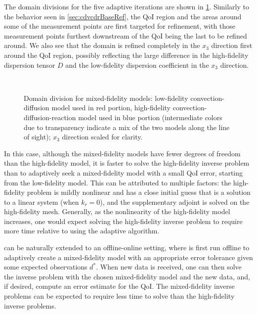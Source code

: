 The domain divisions for the five adaptive iterations are shown in \cref{fig:divvy3D_diffmesh}. Similarly to the behavior seen in \cref{sec:cdvcdrBaseRef}, the QoI region and the areas around some of the measurement points are first targeted for refinement, with those measurement points furthest downstream of the QoI being the last to be refined around. We also see that the domain is refined completely in the $x_3$ direction first around the QoI region, possibly reflecting the large difference in the high-fidelity dispersion tensor $D$ and the low-fidelity dispersion coefficient in the $x_3$ direction.
%
\begin{figure}[htbp]
\centering
{}
 \\
\caption{Domain division for mixed-fidelity models: low-fidelity convection-diffusion model used in red portion, high-fidelity convection-diffusion-reaction model used in blue portion (intermediate colors due to transparency indicate a mix of the two models along the line of sight); $x_3$ direction scaled for clarity.}
\label{fig:divvy3D_diffmesh}
\end{figure} 
%
In this case, although the mixed-fidelity models have fewer degrees of freedom than the high-fidelity model, it is faster to solve the high-fidelity inverse problem than to adaptively seek a mixed-fidelity model with a small QoI error, starting from the low-fidelity model. This can be attributed to multiple factors: the high-fidelity problem is mildly nonlinear and has a close initial guess that is a solution to a linear system (when $k_r=0$), and the supplementary adjoint is solved on the high-fidelity mesh. Generally, as the nonlinearity of the high-fidelity model increases, one would expect solving the high-fidelity inverse problem to require more time relative to using the adaptive algorithm. 

 can be naturally extended to an offline-online setting, where  is first run offline to adaptively create a mixed-fidelity model with an appropriate error tolerance given some expected observations $d^*$. When new data is received, one can then solve the inverse problem with the chosen mixed-fidelity model and the new data, and, if desired, compute an error estimate for the QoI. The mixed-fidelity inverse problems can be expected to require less time to solve than the high-fidelity inverse problems.

